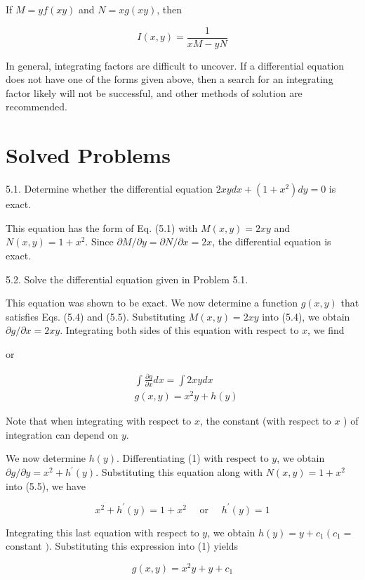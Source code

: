 \documentclass[10pt]{article}
\begin{document}
If $M=y f(x y)$ and $N=x g(x y)$, then


\begin{equation*}
I(x, y)=\frac{1}{x M-y N} \tag{5.10}
\end{equation*}


In general, integrating factors are difficult to uncover. If a differential equation does not have one of the forms given above, then a search for an integrating factor likely will not be successful, and other methods of solution are recommended.

\section*{Solved Problems}
5.1. Determine whether the differential equation $2 x y d x+\left(1+x^{2}\right) d y=0$ is exact.

This equation has the form of Eq. (5.1) with $M(x, y)=2 x y$ and $N(x, y)=1+x^{2}$. Since $\partial M / \partial y=\partial N / \partial x=2 x$, the differential equation is exact.

5.2. Solve the differential equation given in Problem 5.1.

This equation was shown to be exact. We now determine a function $g(x, y)$ that satisfies Eqs. (5.4) and (5.5). Substituting $M(x, y)=2 x y$ into (5.4), we obtain $\partial g / \partial x=2 x y$. Integrating both sides of this equation with respect to $x$, we find

or


\begin{align*}
& \int \frac{\partial g}{\partial x} d x=\int 2 x y d x \\
& g(x, y)=x^{2} y+h(y) \tag{1}
\end{align*}


Note that when integrating with respect to $x$, the constant (with respect to $x$ ) of integration can depend on $y$.

We now determine $h(y)$. Differentiating (1) with respect to $y$, we obtain $\partial g / \partial y=x^{2}+h^{\prime}(y)$. Substituting this equation along with $N(x, y)=1+x^{2}$ into (5.5), we have

$$
x^{2}+h^{\prime}(y)=1+x^{2} \quad \text { or } \quad h^{\prime}(y)=1
$$

Integrating this last equation with respect to $y$, we obtain $h(y)=y+c_{1}\left(c_{1}=\right.$ constant $)$. Substituting this expression into (1) yields

$$
g(x, y)=x^{2} y+y+c_{1}
$$
\end{document}
